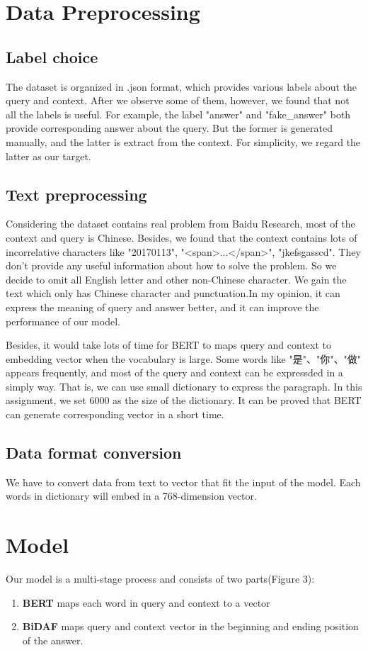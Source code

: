 \documentclass{article}
\begin{document}
\section{Data Preprocessing}
\subsection{Label choice}
The dataset is organized in .json format, which provides various labels about the query and context. After we observe some of them, however, we found that not all the labels is useful. For example, the label "answer" and "fake\_answer" both provide corresponding answer about the query. But the former is generated manually, and the latter is extract from the context. For simplicity, we regard the latter as our target.
\subsection{Text preprocessing}
Considering the dataset contains real problem from Baidu Research, most of the context and query is Chinese. Besides, we found that the context contains lots of incorrelative characters like "20170113", "<span>...</span>", "jkefsgasscd". They don't provide any useful information about how to solve the problem. So we decide to omit all English letter and other non-Chinese character. We gain the text which only has Chinese character and punctuation.In my opinion, it can express the meaning of query and answer better, and it can improve the performance of our model.

Besides, it would take lots of time for BERT to maps query and context to embedding vector when the vocabulary is large. Some words like "是"、"你"、"做" appears frequently, and most of the query and context can be expressded in a simply way. That is, we can use small dictionary to express the paragraph. In this assignment, we set 6000 as the size of the dictionary. It can be proved that BERT can generate corresponding vector in a short time.
\subsection{Data format conversion}
We have to convert data from text to vector that fit the input of the model. Each words in dictionary will embed in a 768-dimension vector. 
\section{Model}
\noindent Our model is a multi-stage process and consists of two parts(Figure 3):\\
\begin{enumerate}
	\item \textbf{BERT} maps each word in query and context to a vector  
	\item \textbf{BiDAF} maps query and context vector in the beginning and ending position of the answer.
\end{enumerate}
\end{document}
